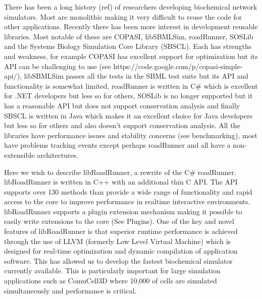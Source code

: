 \documentclass{bioinfo}
\begin{document}
There has been a long history (ref) of researchers developing \citep{Bag01} biochemical network simulators. Most are monolithic making it very difficult to reuse the code for other applications. Recently there has been more interest in development reusable libraries. Most notable of these are COPASI, libSBMLSim, roadRunner, SOSLib and the Systems Biology Simulation Core Library (SBSCL). Each has strengths and weakness, for example COPASI has excellent support for optimization but its API can be challenging to use (see https://code.google.com/p/copasi-simple-api/), libSBMLSim passes all the tests in the SBML test suite but its API and functionality is somewhat limited, roadRunner is written in C\# which is excellent for .NET developers but less so for others, SOSLib is no longer supported but it has a reasonable API but does not support conservation analysis and finally SBSCL is written in Java which makes it an excellent choice for Java developers but less so for others and also doesn't support conservation analysis. All the libraries have performance issues and stability concerns (see benchmarking), most have problems tracking events except perhaps roadRunner and all have a non-extensible architectures.

Here we wish to describe libRoadRunner, a rewrite of the C\# roadRunner. libRoadRunner is written in C++ with an additional thin C API. The API supports over 130 methods than provide a wide range of functionality and rapid access to the core to improve performance in realtime interactive environments. libRoadRunner supports a plugin extension mechanism making it possible to easily write extensions to the core (See Plugins). One of the key and novel features of libRoadRunner is that superior runtime performance is achieved through the use of LLVM (formerly Low Level Virtual Machine) which is designed for real-time optimization and dynamic compilation of application software. This has allowed us to develop the fastest biochemical simulator currently available. This is particularly important for large simulation applications such as ComuCell3D where 10,000 of cells are simulated simultaneously and performance is critical.
\end{document}
